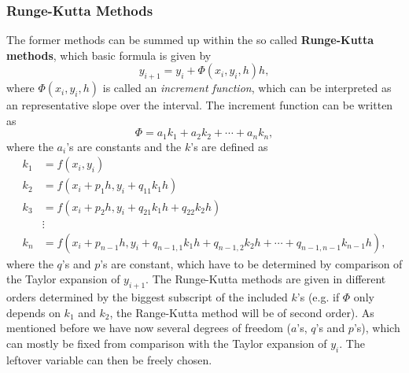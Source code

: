 \subsubsection{Runge-Kutta Methods}
The former methods can be summed up within the so called \textbf{Runge-Kutta methods}, which basic formula is given by
\begin{equation}
	y_{i+1} = y_i + \Phi(x_i, y_i, h) h,
\end{equation}
where $\Phi(x_i, y_i, h)$ is called an \textit{increment function}, which can be interpreted as an representative slope over the interval. The increment function can be written as
\begin{equation}
	\Phi = a_1 k_1 + a_2 k_2 + \cdots + a_n k_n,
\end{equation}
where the $a_i$'s are constants and the $k$'s are defined as
\begin{align}
	k_1 &= f(x_i, y_i) \\
	k_2 &= f(x_i + p_1 h, y_i + q_{11} k_1 h) \\
	k_3 &= f(x_i + p_2 h, y_i + q_{21} k_1 h + q_{22} k_2 h) \\
	&\vdots  \\
	k_n &= f(x_i + p_{n-1} h, y_i + q_{n-1,1} k_1 h + q_{n-1,2} k_2 h+ \cdots + q_{n-1,n-1} k_{n-1} h),
\end{align}
where the $q$'s and $p$'s are constant, which have to be determined by comparison of the Taylor expansion of $y_{i+1}$. The Runge-Kutta methods are given in different orders determined by the biggest subscript of the included $k$'s (e.g. if $\Phi$ only depends on $k_1$ and $k_2$, the Range-Kutta method will be of second order). As mentioned before we have now several degrees of freedom ($a$'s, $q$'s and $p$'s), which can mostly be fixed from comparison with the Taylor expansion of $y_i$. The leftover variable can then be freely chosen. 

